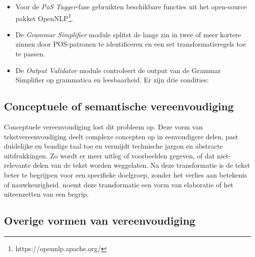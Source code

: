 \begin{itemize}
	\item Voor de \textit{PoS Tagger}-fase gebruikten \textcite{Kandula2010} beschikbare functies uit het open-source pakket OpenNLP\footnote{https://opennlp.apache.org/}.
	\item De \textit{Grammar Simplifier} module splitst de lange zin in twee of meer kortere zinnen door POS-patronen te identificeren en een set transformatieregels toe te passen.
	\item De \textit{Output Validator} module controleert de output van de Grammar Simplifier op grammatica en leesbaarheid. Er zijn drie condities:
\end{itemize}  



\subsection{Conceptuele of semantische vereenvoudiging}

Conceptuele vereenvoudiging lost dit probleem op. Deze vorm van tekstvereenvoudiging deelt complexe concepten op in eenvoudigere delen, past duidelijke en bondige taal toe en vermijdt technische jargon en abstracte uitdrukkingen. Zo wordt er meer uitleg of voorbeelden gegeven, of dat niet-relevante delen van de tekst worden weggelaten. Na deze transformatie is de tekst beter te begrijpen voor een specifieke doelgroep, zonder het verlies aan betekenis of nauwkeurigheid. \textcite{Siddharthan2014} noemt deze transformatie een vorm van elaboratie of het uiteenzetten van een begrip.

\subsection{Overige vormen van vereenvoudiging}

